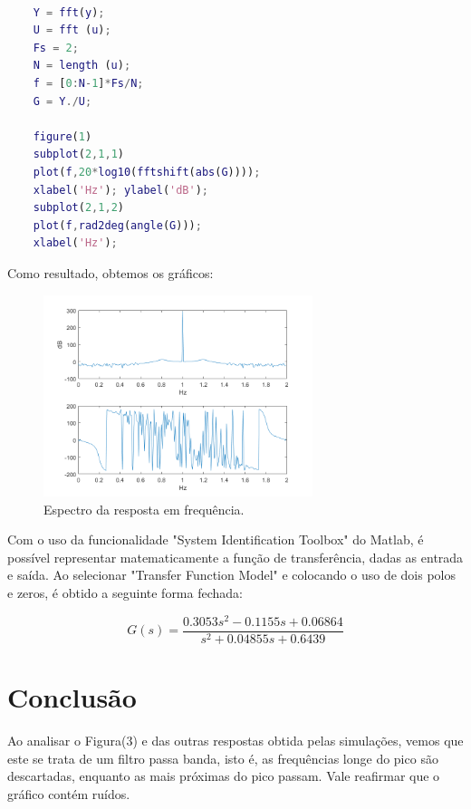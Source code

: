 \documentclass[12pt]{article}
\begin{document}
\begin{lstlisting}[language = Matlab]

    Y = fft(y);
    U = fft (u);
    Fs = 2;
    N = length (u);
    f = [0:N-1]*Fs/N;
    G = Y./U;

    figure(1)
    subplot(2,1,1)
    plot(f,20*log10(fftshift(abs(G))));
    xlabel('Hz'); ylabel('dB');
    subplot(2,1,2)
    plot(f,rad2deg(angle(G)));
    xlabel('Hz'); 
\end{lstlisting}


\quad Como resultado, obtemos os gráficos:

\begin{figure}[H] 
    \centering
    \includegraphics[width=0.7\textwidth]{Gráfico 02.png}
    \caption{Espectro da resposta em frequência.}
    \label{fig:mesh2}
\end{figure}
\par Com o uso da funcionalidade "System Identification Toolbox" do Matlab, é possível representar matematicamente a função de transferência, dadas as entrada e saída. Ao selecionar "Transfer Function Model" e colocando o uso de dois polos e zeros, é obtido a seguinte forma fechada:

\begin{equation}
    G(s) = \frac{0.3053s^2 - 0.1155s + 0.06864}{s^2 + 0.04855s + 0.6439}
\end{equation}

\section{Conclusão}
\quad Ao analisar o Figura(3) e das outras respostas obtida pelas simulações, vemos que este se trata de um filtro passa banda, isto é, as frequências longe do pico  são descartadas, enquanto as mais próximas do pico passam. Vale reafirmar que o gráfico contém ruídos.
\end{document}
